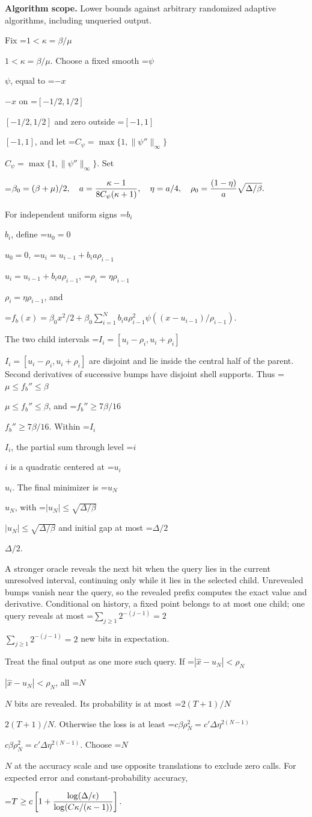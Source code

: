 \documentclass[10pt,a4paper]{article}
\newcommand{\AtlasMath}[1]{\par\begingroup\centering\setbox0=\hbox{$\displaystyle #1$}\ifdim\wd0>1.4\linewidth\typeout{ATLAS WIDE FORMULA: \the\wd0}\fi\ifdim\wd0>\linewidth\resizebox{\linewidth}{!}{\box0}\else\box0\fi\par\endgroup}
\newcommand{\AtlasInlineMath}[1]{\begingroup\setbox0=\hbox{$#1$}\ifdim\wd0>.4\linewidth\endgroup\AtlasMath{#1}\else\endgroup$#1$\fi}
\begin{document}
\textbf{Algorithm scope.} Lower bounds against arbitrary randomized adaptive algorithms, including unqueried output.

Fix \AtlasInlineMath{1<\kappa=\beta/\mu}. Choose a fixed smooth \AtlasInlineMath{\psi}, equal to \AtlasInlineMath{-x} on \AtlasInlineMath{[-1/2,1/2]} and zero outside \AtlasInlineMath{[-1,1]}, and let \AtlasInlineMath{C_\psi=\max\{1,\|\psi''\|_\infty\}}. Set

\AtlasMath{\beta_0=(\beta+\mu)/2,\quad a={\kappa-1\over8C_\psi(\kappa+1)},\quad
\eta=a/4,\quad \rho_0={(1-\eta)\over a}\sqrt{\Delta/\beta}.}

For independent uniform signs \AtlasInlineMath{b_i}, define \AtlasInlineMath{u_0=0},
\AtlasInlineMath{u_i=u_{i-1}+b_i a\rho_{i-1}}, \AtlasInlineMath{\rho_i=\eta\rho_{i-1}}, and

\AtlasMath{f_b(x)=\beta_0x^2/2+
\beta_0\sum_{i=1}^N b_i a\rho_{i-1}^2
\psi((x-u_{i-1})/\rho_{i-1}).}

The two child intervals \AtlasInlineMath{I_i=[u_i-\rho_i,u_i+\rho_i]} are disjoint and lie inside the central half of the parent. Second derivatives of successive bumps have disjoint shell supports. Thus \AtlasInlineMath{\mu\le f_b''\le\beta}, and \AtlasInlineMath{f_b''\ge7\beta/16}. Within \AtlasInlineMath{I_i}, the partial sum through level \AtlasInlineMath{i} is a quadratic centered at \AtlasInlineMath{u_i}. The final minimizer is \AtlasInlineMath{u_N}, with \AtlasInlineMath{|u_N|\le\sqrt{\Delta/\beta}} and initial gap at most \AtlasInlineMath{\Delta/2}.

A stronger oracle reveals the next bit when the query lies in the current unresolved interval, continuing only while it lies in the selected child. Unrevealed bumps vanish near the query, so the revealed prefix computes the exact value and derivative. Conditional on history, a fixed point belongs to at most one child; one query reveals at most \AtlasInlineMath{\sum_{j\ge1}2^{-(j-1)}=2} new bits in expectation.

Treat the final output as one more such query. If \AtlasInlineMath{|\widehat x-u_N|<\rho_N}, all \AtlasInlineMath{N} bits are revealed. Its probability is at most \AtlasInlineMath{2(T+1)/N}. Otherwise the loss is at least
\AtlasInlineMath{c\beta\rho_N^2=c'\Delta\eta^{2(N-1)}}.
Choose \AtlasInlineMath{N} at the accuracy scale and use opposite translations to exclude zero calls. For expected error and constant-probability accuracy,

\AtlasMath{T\ge c\left[1+{\log(\Delta/\epsilon)\over
\log(C\kappa/(\kappa-1))}\right].}
\end{document}
